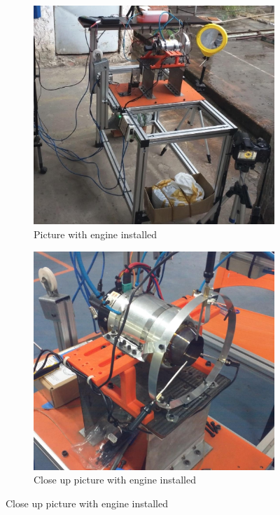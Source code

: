 \documentclass[tcc]{subfiles}
\begin{document}
\begin{figure}[p]
    \begin{subfigure}{.49\textwidth}
        \includegraphics[width=.9\textwidth]{fig/engine_in_bench3.jpg}
        \caption{Picture with engine installed}
        \label{fig:test_bench!picture}
    \end{subfigure}
    \begin{subfigure}{.49\textwidth}
        \includegraphics[width=.9\textwidth]{fig/engine_in_bench.jpg}
        \caption{Close up picture with engine installed}
        \label{fig:engine!closeup}
    \end{subfigure}
\end{figure}
\end{document}
